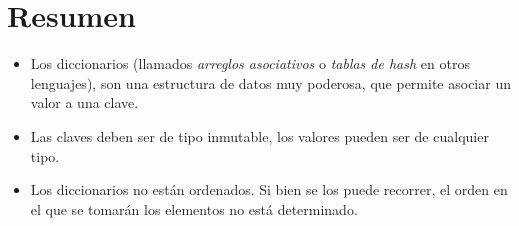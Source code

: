 \section{Resumen}

\begin{itemize}
\item Los diccionarios (llamados {\it arreglos asociativos} o {\it tablas
de hash} en otros lenguajes), son una estructura de datos muy poderosa, que permite
asociar un valor a una clave.
\item Las claves deben ser de tipo inmutable, los valores
pueden ser de cualquier tipo.
\item Los diccionarios no están ordenados.  Si bien se los puede recorrer,
el orden en el que se tomarán los elementos no está determinado.
\end{itemize}

